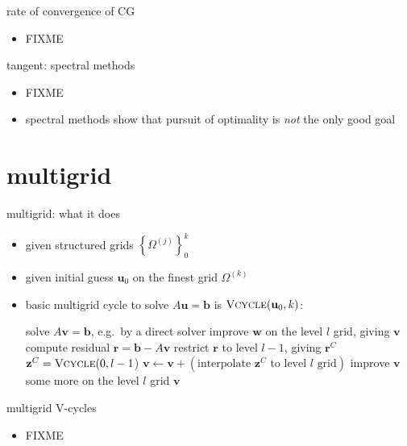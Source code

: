 \documentclass[hide notes,intlimits,usenames,dvipsnames]{beamer}
\newcommand{\bb}{\mathbf{b}}
\newcommand{\br}{\mathbf{r}}
\newcommand{\bu}{\mathbf{u}}
\newcommand{\bv}{\mathbf{v}}
\newcommand{\bw}{\mathbf{w}}
\newcommand{\bz}{\mathbf{z}}
\begin{document}
\begin{frame}{rate of convergence of CG}
\begin{itemize}
\item FIXME
\end{itemize}
\end{frame}


\begin{frame}{tangent: spectral methods}
\begin{itemize}
\item FIXME
\item spectral methods show that pursuit of optimality is \emph{not} the only good goal
\end{itemize}
\end{frame}


\section{multigrid}

\begin{frame}{multigrid: what it does}

\small
\begin{itemize}
\item given structured grids $\left\{\Omega^{(j)}\right\}_0^k$
\item given initial guess $\bu_0$ on the finest grid $\Omega^{(k)}$
\item basic multigrid cycle to solve $A \bu = \bb$ is $\text{\textsc{Vcycle}}(\bu_0,k)$:

\medskip
\begin{algorithmic}
\footnotesize
\Function{Vcycle}{$\bw,l$}
        \State solve $A \bv = \bb$, e.g.~by a direct solver
    \Else
        \State improve $\bw$ on the level $l$ grid, giving $\bv$
        \State compute residual $\br = \bb - A \bv$
        \State restrict $\br$ to level $l-1$, giving $\br^C$
        \State $\bz^C = \text{\textsc{Vcycle}}(0,l-1$)
        \State $\bv \gets \bv + (\text{interpolate } \bz^C \text{ to level $l$ grid})$
        \State improve $\bv$ some more on the level $l$ grid
        \EndIf
    \Return $\bv$
\EndFunction
\end{algorithmic}
\end{itemize}
\end{frame}


\begin{frame}{multigrid V-cycles}

\begin{itemize}
\item FIXME
\end{itemize}




\medskip
\qquad 
\end{frame}
\end{document}
